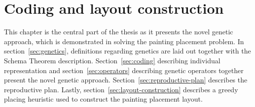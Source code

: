 \chapter{Coding and layout construction}\label{ch:coding-and-layout-construction}

This chapter is the central part of the thesis
as it presents the novel genetic approach, which is demonstrated in solving the painting placement problem.
In section~\ref{sec:genetics}, definitions regarding genetics are laid out together with the Schema Theorem description.
Section~\ref{sec:coding} describing individual representation and section~\ref{sec:operators}
describing genetic operators together present the novel genetic approach.
Section~\ref{sec:reproductive-plan} describes the reproductive plan.
Lastly, section~\ref{sec:layout-construction} describes a greedy placing heuristic
used to construct the painting placement layout.






